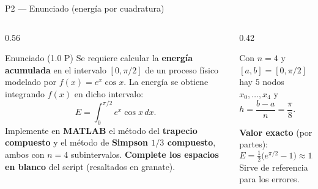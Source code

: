 \documentclass[aspectratio=169,10pt]{beamer}
\begin{document}
\begin{frame}{P2 — Enunciado (energía por cuadratura)}
\begin{columns}[T]
\begin{column}{0.56\textwidth}
\begin{cardidea}{Enunciado \textmd{\small(1.0 P)}}{\faQuestionCircle}
{\footnotesize Se requiere calcular la \textbf{energía acumulada} en el intervalo $[0,\pi/2]$ de un proceso físico modelado por $f(x)=e^{x}\cos x$. La energía se obtiene integrando $f(x)$ en dicho intervalo:
\[
E=\int_0^{\pi/2} e^{x}\cos x\,dx.
\]
Implemente en \textbf{MATLAB} el método del \textbf{trapecio compuesto} y el método de \textbf{Simpson $1/3$ compuesto}, ambos con $n=4$ subintervalos. \textbf{Complete los espacios en blanco} del script (resaltados en granate).}
\end{cardidea}
\end{column}
\begin{column}{0.42\textwidth}
\begin{cardnota}[\faInfoCircle]
{\footnotesize Con $n=4$ y $[a,b]=[0,\pi/2]$ hay $5$ nodos $x_0,\dots,x_4$ y $h=\dfrac{b-a}{n}=\dfrac{\pi}{8}$.}
\end{cardnota}
\vspace{1mm}
\begin{cardnota}[\faKey]
{\footnotesize \textbf{Valor exacto} (por partes):
\[
E=\tfrac12\big(e^{\pi/2}-1\big)\approx 1.9052.
\]
Sirve de referencia para los errores.}
\end{cardnota}
\end{column}
\end{columns}
\end{frame}
\end{document}
